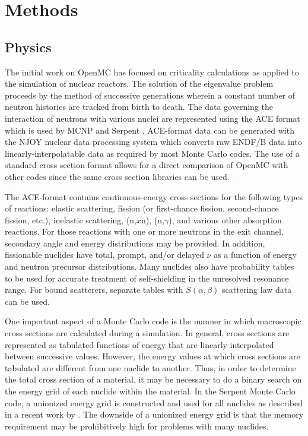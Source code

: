 \documentclass[authoryear,preprint]{elsarticle}
\begin{document}
\section{Methods}

\subsection{Physics}

The initial work on OpenMC has focused on criticality calculations as applied to
the simulation of nuclear reactors. The solution of the eigenvalue problem
proceeds by the method of successive generations \citep{lieberoth} wherein a
constant number of neutron histories are tracked from birth to death. The data
governing the interaction of neutrons with various nuclei are represented using
the ACE format \citep{ace-format} which is used by MCNP \citep{mcnp} and Serpent
\citep{serpent}. ACE-format data can be generated with the NJOY nuclear data
processing system which converts raw ENDF/B data into linearly-interpolatable data
as required by most Monte Carlo codes. The use of a standard cross section
format allows for a direct comparison of OpenMC with other codes since the same
cross section libraries can be used.

The ACE-format contains continuous-energy cross sections for the following types
of reactions: elastic scattering, fission (or first-chance fission,
second-chance fission, etc.), inelastic scattering, (n,$x$n), (n,$\gamma$), and
various other absorption reactions. For those reactions with one or more
neutrons in the exit channel, secondary angle and energy distributions may be
provided. In addition, fissionable nuclides have total, prompt, and/or delayed
$\nu$ as a function of energy and neutron precursor distributions. Many nuclides
also have probability tables to be used for accurate treatment of self-shielding
in the unresolved resonance range. For bound scatterers, separate tables with
$S(\alpha,\beta)$ scattering law data can be used.

One important aspect of a Monte Carlo code is the manner in which macroscopic
cross sections are calculated during a simulation. In general, cross sections
are represented as tabulated functions of energy that are linearly interpolated
between successive values. However, the energy values at which cross sections
are tabulated are different from one nuclide to another. Thus, in order to
determine the total cross section of a material, it may be necessary to do a
binary search on the energy grid of each nuclide within the material. In the
Serpent Monte Carlo code, a unionized energy grid is constructed and used for
all nuclides as described in a recent work by \citet{uniongrid}. The downside of
a unionized energy grid is that the memory requirement may be prohibitively high
for problems with many nuclides.
\end{document}
